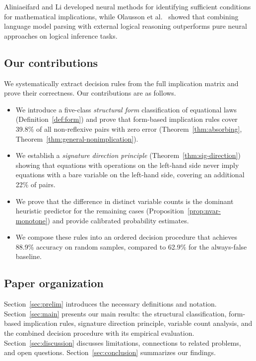 Aliniaeifard and Li \cite{AL2025} developed neural methods for identifying
sufficient conditions for mathematical implications, while Olausson et
al.~\cite{LINC2023} showed that combining language model parsing with external
logical reasoning outperforms pure neural approaches on logical inference tasks.

\subsection{Our contributions}
We systematically extract decision rules from the full implication matrix and
prove their correctness.  Our contributions are as follows.

\begin{itemize}[leftmargin=*,itemsep=2pt,topsep=2pt]
\item We introduce a five-class \emph{structural form} classification of
  equational laws (Definition~\ref{def:form}) and prove that form-based
  implication rules cover 39.8\% of all non-reflexive pairs with zero error
  (Theorem~\ref{thm:absorbing}, Theorem~\ref{thm:general-nonimplication}).

\item We establish a \emph{signature direction principle}
  (Theorem~\ref{thm:sig-direction}) showing that equations with operations on
  the left-hand side never imply equations with a bare variable on the
  left-hand side, covering an additional 22\% of pairs.

\item We prove that the difference in distinct variable counts is the dominant
  heuristic predictor for the remaining cases
  (Proposition~\ref{prop:nvar-monotone}) and provide calibrated probability
  estimates.

\item We compose these rules into an ordered decision procedure that achieves
  88.9\% accuracy on random samples, compared to 62.9\% for the always-false
  baseline.
\end{itemize}

\subsection{Paper organization}
Section~\ref{sec:prelim} introduces the necessary definitions and notation.
Section~\ref{sec:main} presents our main results: the structural classification,
form-based implication rules, signature direction principle, variable count
analysis, and the combined decision procedure with its empirical evaluation.
Section~\ref{sec:discussion} discusses limitations, connections to related
problems, and open questions.  Section~\ref{sec:conclusion} summarizes our
findings.
